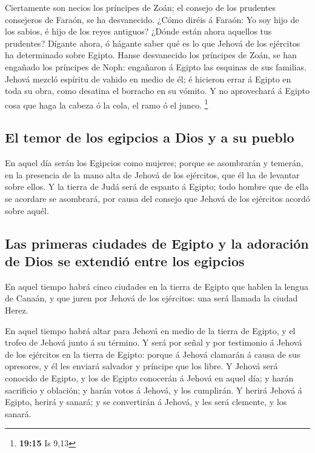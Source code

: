  Ciertamente son necios los príncipes de Zoán; el consejo
de los prudentes consejeros de Faraón, se ha desvanecido. ¿Cómo diréis á
Faraón: Yo soy hijo de los sabios, é hijo de los reyes antiguos?
 ¿Dónde están ahora aquellos tus prudentes? Dígante ahora,
ó hágante saber qué es lo que Jehová de los ejércitos ha determinado
sobre Egipto.  Hanse desvanecido los príncipes de Zoán, se
han engañado los príncipes de Noph: engañaron á Egipto las esquinas de
sus familias.  Jehová mezcló espíritu de vahido en medio de
él; é hicieron errar á Egipto en toda su obra, como desatina el borracho
en su vómito.  Y no aprovechará á Egipto cosa que haga la
cabeza ó la cola, el ramo ó el junco. \footnote{\textbf{19:15} Is 9,13}

\hypertarget{el-temor-de-los-egipcios-a-dios-y-a-su-pueblo}{%
\subsection{El temor de los egipcios a Dios y a su
pueblo}\label{el-temor-de-los-egipcios-a-dios-y-a-su-pueblo}}

 En aquel día serán los Egipcios como mujeres; porque se
asombrarán y temerán, en la presencia de la mano alta de Jehová de los
ejércitos, que él ha de levantar sobre ellos.  Y la tierra
de Judá será de espanto á Egipto; todo hombre que de ella se acordare se
asombrará, por causa del consejo que Jehová de los ejércitos acordó
sobre aquél.

\hypertarget{las-primeras-ciudades-de-egipto-y-la-adoraciuxf3n-de-dios-se-extendiuxf3-entre-los-egipcios}{%
\subsection{Las primeras ciudades de Egipto y la adoración de Dios se
extendió entre los
egipcios}\label{las-primeras-ciudades-de-egipto-y-la-adoraciuxf3n-de-dios-se-extendiuxf3-entre-los-egipcios}}

 En aquel tiempo habrá cinco ciudades en la tierra de
Egipto que hablen la lengua de Canaán, y que juren por Jehová de los
ejércitos: una será llamada la ciudad Herez.

 En aquel tiempo habrá altar para Jehová en medio de la
tierra de Egipto, y el trofeo de Jehová junto á su término.
 Y será por señal y por testimonio á Jehová de los
ejércitos en la tierra de Egipto: porque á Jehová clamarán á causa de
sus opresores, y él les enviará salvador y príncipe que los libre.
 Y Jehová será conocido de Egipto, y los de Egipto
conocerán á Jehová en aquel día; y harán sacrificio y oblación; y harán
votos á Jehová, y los cumplirán.  Y herirá Jehová á Egipto,
herirá y sanará; y se convertirán á Jehová, y les será clemente, y los
sanará.

